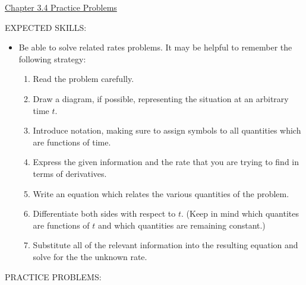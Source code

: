 \documentclass[12pt]{article}
\begin{document}
\begin{center}
\underline{\LARGE{Chapter 3.4 Practice Problems}}
\end{center}

\noindent EXPECTED SKILLS:

\begin{itemize}

\item Be able to solve related rates problems. It may be helpful to remember the following strategy:

\begin{enumerate}

\item Read the problem carefully.

\item Draw a diagram, if possible, representing the situation at an arbitrary time $t$.

\item Introduce notation, making sure to assign symbols to all quantities which are functions of time.

\item Express the given information and the rate that you are trying to find in terms of derivatives.

\item Write an equation which relates the various quantities of the problem. 

\item Differentiate both sides with respect to $t$.  (Keep in mind which quantites are functions of $t$ and which quantities are remaining constant.)

\item Substitute all of the relevant information into the resulting equation and solve for the the unknown rate.

\end{enumerate}

\end{itemize}

\noindent PRACTICE PROBLEMS:
\end{document}
